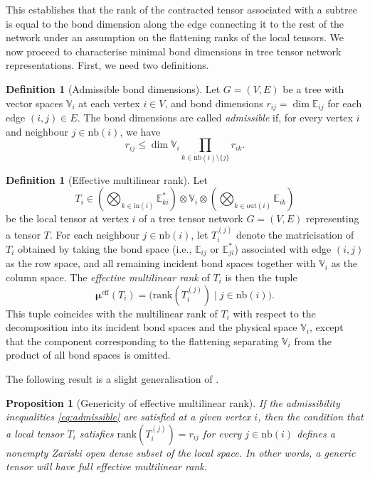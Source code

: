 \documentclass{amsart}
\theoremstyle{plain}
\newtheorem{proposition}[theorem]{Proposition}
\theoremstyle{definition}
\newtheorem{definition}[theorem]{Definition}
\theoremstyle{remark}
\begin{document}
This establishes that the rank of the contracted tensor associated with a subtree is equal to the bond dimension along the edge connecting it to the rest of the network under an assumption on the flattening ranks of the local tensors. We now proceed to characterise minimal bond dimensions in tree tensor network representations. First, we need two definitions.

\begin{definition}[Admissible bond dimensions]\label{def:admissible}
	Let $G=(V,E)$ be a tree with vector spaces $\mathbb V_i$ at each vertex $i\in V$, and bond dimensions $r_{ij}=\dim\mathbb E_{ij}$ for each edge $(i,j)\in E$. The bond dimensions are called \emph{admissible} if, for every vertex $i$ and neighbour $j \in \mathrm{nb}(i)$, we have
	\begin{equation}\label{eq:admissible}
	r_{ij} \le \dim \mathbb V_i\prod_{k \in \mathrm{nb}(i)\setminus\{j\}} r_{ik}.
	\end{equation}
\end{definition}

\begin{definition}[Effective multilinear rank]\label{def:eff_ml_rank}
Let
\[
T_i \in \left(\!\bigotimes_{k\in\mathrm{in}(i)} \mathbb E_{ki}^*\right)
   \otimes \mathbb V_i \otimes
   \left(\!\bigotimes_{k\in\mathrm{out}(i)} \mathbb E_{ik}\right)
\]
be the local tensor at vertex $i$ of a tree tensor network $G=(V, E)$ representing a tensor $T$. For each neighbour $j \in \mathrm{nb}(i)$, let $T_i^{(j)}$ denote the matricisation of $T_i$ obtained by taking the bond space (i.e., $\mathbb E_{ij}$ or $\mathbb E_{ji}^*$) associated with edge $(i,j)$ as the row space, and all remaining incident bond spaces together with $\mathbb V_i$ as the column space. The \emph{effective multilinear rank} of $T_i$ is then the tuple
\[
\boldsymbol{\mu}^{\mathrm{eff}}(T_i)
= \bigl(\mathrm{rank} (T_i^{(j)}) \mid j\in\mathrm{nb}(i)\bigr).
\]
This tuple coincides with the multilinear rank of $T_i$ with respect to the decomposition into its incident bond spaces and the physical space $\mathbb V_i$, except that the component corresponding to the flattening separating $\mathbb V_i$ from the product of all bond spaces is omitted.
\end{definition}

 The following result is a slight generalisation of \cite[Theorem 7]{carlinikleppe}.
 
\begin{proposition}[Genericity of effective multilinear rank]\label{prop:fullEffectiveRank}
	If the admissibility inequalities \eqref{eq:admissible} are satisfied at a given vertex $i$, then the condition that a local tensor $T_i$ satisfies $\mathrm{rank} (T_i^{(j)}) = r_{ij}$ for every $j \in \mathrm{nb}(i)$ defines a nonempty Zariski open dense subset of the local space. In other words, a generic tensor will have full effective multilinear rank.
\end{proposition}
\end{document}
